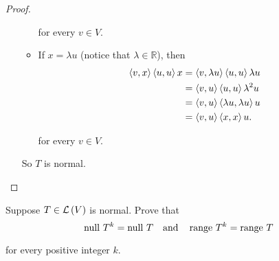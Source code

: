 \begin{proof}
\begin{enumerate}[label={(\alph*)}]
\begin{itemize}
                        for every $v\in V$.
                  \item If $x = \lambda u$ (notice that $\lambda\in\mathbb{R}$), then
                        \begin{align*}
                            \left\langle{v, x}\right\rangle\left\langle{u, u}\right\rangle x & = \left\langle{v, \lambda u}\right\rangle\left\langle{u, u}\right\rangle\lambda u \\
                                                              & = \left\langle{v, u}\right\rangle\left\langle{u, u}\right\rangle\lambda^{2}u      \\
                                                              & = \left\langle{v, u}\right\rangle\left\langle{\lambda u, \lambda u}\right\rangle u \\
                                                              & = \left\langle{v, u}\right\rangle\left\langle{x, x}\right\rangle u.
                        \end{align*}

                        for every $v\in V$.
              \end{itemize}

              So $T$ is normal.
    \end{enumerate}
\end{proof}
\newpage

\begin{exercise}\label{chapter7:sectionA:exercise27}
    Suppose $T\in\mathcal{L}\left({V}\right)$ is normal. Prove that
    \[
        \operatorname{null}\,{T^{k}} = \operatorname{null}\,{T}\quad\text{and}\quad \operatorname{range}\,{T^{k}} = \operatorname{range}\,{T}
    \]

    for every positive integer $k$.
\end{exercise}

